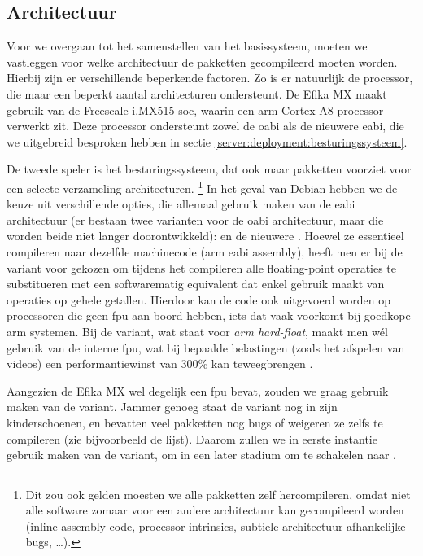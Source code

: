 \subsection{Architectuur}
\label{kiosk:deployment:besturingssysteem:architectuur}

Voor we overgaan tot het samenstellen van het basissysteem, moeten we vastleggen voor welke architectuur de pakketten gecompileerd moeten worden. Hierbij zijn er verschillende beperkende factoren. Zo is er natuurlijk de processor, die maar een beperkt aantal architecturen ondersteunt. De Efika MX maakt gebruik van de Freescale i.MX515 \ac{soc}, waarin een \ac{arm} Cortex-A8 processor verwerkt zit. Deze processor ondersteunt zowel de \ac{oabi} als de nieuwere \ac{eabi}, die we uitgebreid besproken hebben in sectie \ref{server:deployment:besturingssysteem}.

De tweede speler is het besturingssysteem, dat ook maar pakketten voorziet voor een selecte verzameling architecturen. \footnote{Dit zou ook gelden moesten we alle pakketten zelf hercompileren, omdat niet alle software zomaar voor een andere architectuur kan gecompileerd worden (inline assembly code, processor-intrinsics, subtiele architectuur-afhankelijke bugs, \ldots).} In het geval van Debian hebben we de keuze uit verschillende opties, die allemaal gebruik maken van de \ac{eabi} architectuur (er bestaan twee varianten voor de \ac{oabi} architectuur, maar die worden beide niet langer doorontwikkeld):  en de nieuwere . Hoewel ze essentieel compileren naar dezelfde machinecode (\ac{arm} \ac{eabi} assembly), heeft men er bij de  variant voor gekozen om tijdens het compileren alle floating-point operaties te substitueren met een softwarematig equivalent dat enkel gebruik maakt van operaties op gehele getallen. Hierdoor kan de code ook uitgevoerd worden op processoren die geen \ac{fpu} aan boord hebben, iets dat vaak voorkomt bij goedkope \ac{arm} systemen. Bij de  variant, wat staat voor \emph{\ac{arm} hard-float}, maakt men wél gebruik van de interne \ac{fpu}, wat bij bepaalde belastingen (zoals het afspelen van videos) een performantiewinst van 300\% kan teweegbrengen \citep{armhf}.

Aangezien de Efika MX wel degelijk een \ac{fpu} bevat, zouden we graag gebruik maken van de  variant. Jammer genoeg staat de variant nog in zijn kinderschoenen, en bevatten veel pakketten nog bugs of weigeren ze zelfs te compileren (zie bijvoorbeeld de  lijst). Daarom zullen we in eerste instantie gebruik maken van de  variant, om in een later stadium om te schakelen naar .

